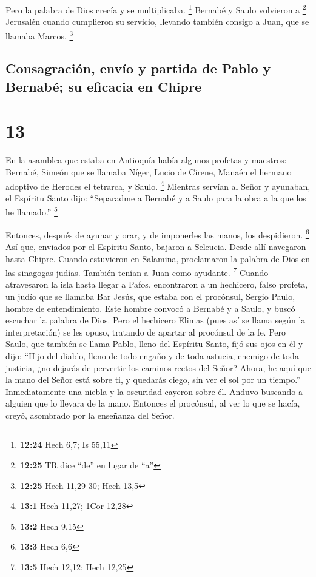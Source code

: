  Pero la palabra de Dios crecía y se multiplicaba.
\footnote{\textbf{12:24} Hech 6,7; Is 55,11}  Bernabé y
Saulo volvieron a \footnote{\textbf{12:25} TR dice ``de'' en lugar de
  ``a''} Jerusalén cuando cumplieron su servicio, llevando también
consigo a Juan, que se llamaba Marcos. \footnote{\textbf{12:25} Hech
  11,29-30; Hech 13,5}

\hypertarget{consagraciuxf3n-envuxedo-y-partida-de-pablo-y-bernabuxe9-su-eficacia-en-chipre}{%
\subsection{Consagración, envío y partida de Pablo y Bernabé; su
eficacia en
Chipre}\label{consagraciuxf3n-envuxedo-y-partida-de-pablo-y-bernabuxe9-su-eficacia-en-chipre}}

\hypertarget{section-12}{%
\section{13}\label{section-12}}

 En la asamblea que estaba en Antioquía había algunos
profetas y maestros: Bernabé, Simeón que se llamaba Níger, Lucio de
Cirene, Manaén el hermano adoptivo de Herodes el tetrarca, y Saulo.
\footnote{\textbf{13:1} Hech 11,27; 1Cor 12,28}  Mientras
servían al Señor y ayunaban, el Espíritu Santo dijo: ``Separadme a
Bernabé y a Saulo para la obra a la que los he llamado.'' \footnote{\textbf{13:2}
  Hech 9,15}

 Entonces, después de ayunar y orar, y de imponerles las
manos, los despidieron. \footnote{\textbf{13:3} Hech 6,6} 
Así que, enviados por el Espíritu Santo, bajaron a Seleucia. Desde allí
navegaron hasta Chipre.  Cuando estuvieron en Salamina,
proclamaron la palabra de Dios en las sinagogas judías. También tenían a
Juan como ayudante. \footnote{\textbf{13:5} Hech 12,12; Hech 12,25}
 Cuando atravesaron la isla hasta llegar a Pafos,
encontraron a un hechicero, falso profeta, un judío que se llamaba Bar
Jesús,  que estaba con el procónsul, Sergio Paulo, hombre
de entendimiento. Este hombre convocó a Bernabé y a Saulo, y buscó
escuchar la palabra de Dios.  Pero el hechicero Elimas
(pues así se llama según la interpretación) se les opuso, tratando de
apartar al procónsul de la fe.  Pero Saulo, que también se
llama Pablo, lleno del Espíritu Santo, fijó sus ojos en él
 y dijo: ``Hijo del diablo, lleno de todo engaño y de
toda astucia, enemigo de toda justicia, ¿no dejarás de pervertir los
caminos rectos del Señor?  Ahora, he aquí que la mano del
Señor está sobre ti, y quedarás ciego, sin ver el sol por un tiempo.''
Inmediatamente una niebla y la oscuridad cayeron sobre él. Anduvo
buscando a alguien que lo llevara de la mano.  Entonces
el procónsul, al ver lo que se hacía, creyó, asombrado por la enseñanza
del Señor.

